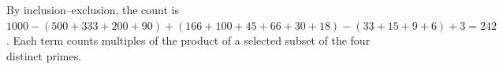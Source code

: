 By inclusion--exclusion, the count is $1000-(500+333+200+90)+(166+100+45+66+30+18)-(33+15+9+6)+3=\boxed{242}$. Each term counts multiples of the product of a selected subset of the four distinct primes.
